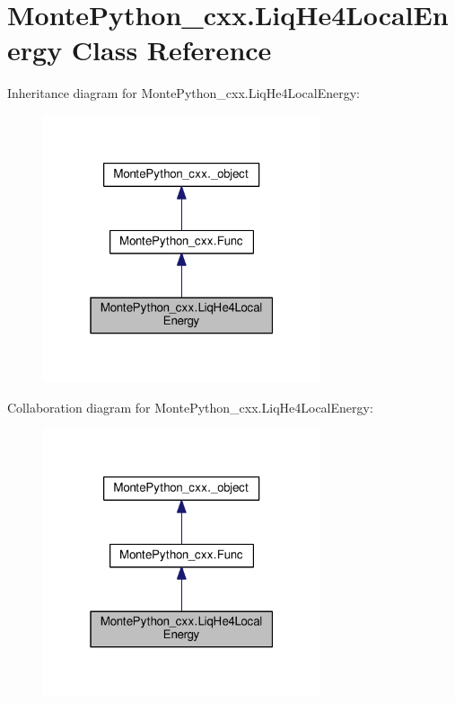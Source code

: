 \hypertarget{classMontePython__cxx_1_1LiqHe4LocalEnergy}{}\section{Monte\+Python\+\_\+cxx.\+Liq\+He4\+Local\+Energy Class Reference}
\label{classMontePython__cxx_1_1LiqHe4LocalEnergy}


Inheritance diagram for Monte\+Python\+\_\+cxx.\+Liq\+He4\+Local\+Energy\+:
\nopagebreak
\begin{figure}[H]
\begin{center}
\leavevmode
\includegraphics[width=232pt]{classMontePython__cxx_1_1LiqHe4LocalEnergy__inherit__graph}
\end{center}
\end{figure}


Collaboration diagram for Monte\+Python\+\_\+cxx.\+Liq\+He4\+Local\+Energy\+:
\nopagebreak
\begin{figure}[H]
\begin{center}
\leavevmode
\includegraphics[width=232pt]{classMontePython__cxx_1_1LiqHe4LocalEnergy__coll__graph}
\end{center}
\end{figure}
